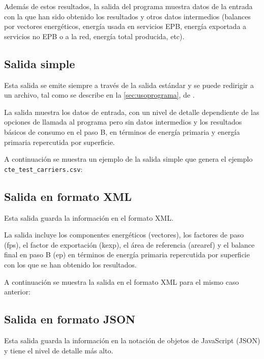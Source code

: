 \documentclass[10pt,notitlepage,oneside,a4paper]{article}
\begin{document}
Además de estos resultados, la salida del programa muestra datos de la entrada con la que han sido obtenido los resultados y otros datos intermedios (balances por vectores energéticos, energía usada en servicios EPB, energía exportada a servicios no EPB o a la red, energía total producida, etc).

\subsection{Salida simple}

Esta salida se emite siempre a través de la salida estándar y se puede redirigir a un archivo, tal como se describe en la \autoref{sec:usoprograma}, de .

La salida muestra los datos de entrada, con un nivel de detalle dependiente de las opciones de llamada al programa pero sin datos intermedios y los resultados básicos de consumo en el paso B, en términos de energía primaria y energía primaria repercutida por superficie.

A continuación se muestra un ejemplo de la salida simple que genera el ejemplo \texttt{cte\_test\_carriers.csv}:



\newpage
\subsection{Salida en formato XML}

Esta salida guarda la información en el formato XML.

La salida incluye los componentes energéticos (vectores), los factores de paso (fps), el factor de exportación (kexp), el área de referencia (arearef) y el balance final en paso B (ep) en términos de energía primaria repercutida por superficie  con los que se han obtenido los resultados.

A continuación se muestra la salida en el formato XML para el mismo caso anterior:



\newpage
\subsection{Salida en formato JSON}

Esta salida guarda la información en la notación de objetos de JavaScript (JSON) y tiene el nivel de detalle más alto.
\end{document}
